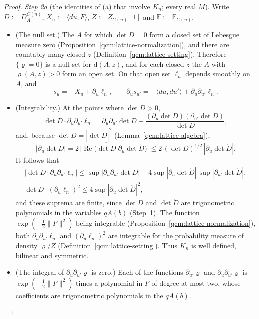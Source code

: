 \documentclass[11pt,letterpaper,reqno]{amsart}
\theoremstyle{definition}
\begin{document}
\begin{proof}
\emph{Step 2a} (the identities of (a) that involve $K_n$; every real $M$).
Write $D:=D^{C(n)}_A$, $X_u:=\langle du,F\rangle$, $Z:=Z_{C(n)}[1]$ and $\mathbb E:=\mathbb E_{C(n)}$.
\begin{itemize}
\item[(i)] (The null set.)
The $A$ for which $\det D=0$ form a closed set of Lebesgue measure zero (Proposition~\ref{qcm:lattice-normalization}), and there are countably many closed $z$ (Definition~\ref{qcm:lattice-setting}).
Therefore $\{\varrho=0\}$ is a null set for $\mathrm d(A,z)$, and for each closed $z$ the $A$ with $\varrho(A,z)>0$ form an open set.
On that open set $\ell_n$ depends smoothly on $A$, and
\begin{equation*}
s_u=-X_u+\partial_u\ell_n,\qquad\partial_us_{u'}=-\langle du,du'\rangle+\partial_u\partial_{u'}\ell_n.
\end{equation*}
\item[(ii)] (Integrability.)
At the points where $\det D>0$,
\begin{equation*}
\det D\cdot\partial_u\partial_{u'}\ell_n=\partial_u\partial_{u'}\det D-\frac{(\partial_u\det D)(\partial_{u'}\det D)}{\det D},
\end{equation*}
and, because $\det D=|\det\check D|^2$ (Lemma~\ref{qcm:lattice-algebra}),
\begin{equation*}
|\partial_u\det D|=2\,\bigl|\operatorname{Re}\bigl(\overline{\det\check D}\;\partial_u\det\check D\bigr)\bigr|\le2\,(\det D)^{1/2}\,|\partial_u\det\check D|.
\end{equation*}
It follows that
\begin{gather*}
|\det D\cdot\partial_u\partial_{u'}\ell_n|\le\sup|\partial_u\partial_{u'}\det D|+4\sup|\partial_u\det\check D|\,\sup|\partial_{u'}\det\check D|,\\
\det D\cdot(\partial_u\ell_n)^2\le4\sup|\partial_u\det\check D|^2,
\end{gather*}
and these suprema are finite, since $\det D$ and $\det\check D$ are trigonometric polynomials in the variables $qA(b)$ (Step~1).
The function $\exp(-\frac12\|F\|^2)$ being integrable (Proposition~\ref{qcm:lattice-normalization}), both $\partial_u\partial_{u'}\ell_n$ and $(\partial_u\ell_n)^2$ are integrable for the probability measure of density $\varrho/Z$ (Definition~\ref{qcm:lattice-setting}).
Thus $K_n$ is well defined, bilinear and symmetric.
\item[(iii)] (The integral of $\partial_u\partial_{u'}\varrho$ is zero.)
Each of the functions $\partial_{u'}\varrho$ and $\partial_u\partial_{u'}\varrho$ is $\exp(-\frac12\|F\|^2)$ times a polynomial in $F$ of degree at most two, whose coefficients are trigonometric polynomials in the $qA(b)$.

\end{itemize}
\end{proof}
\end{document}
